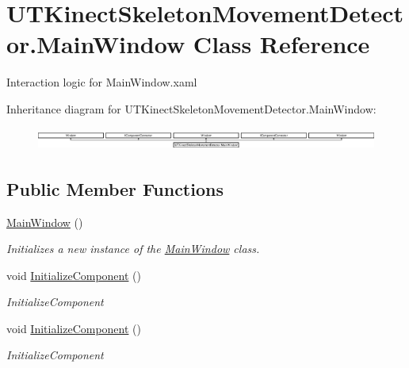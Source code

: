 \hypertarget{classUTKinectSkeletonMovementDetector_1_1MainWindow}{\section{U\-T\-Kinect\-Skeleton\-Movement\-Detector.\-Main\-Window Class Reference}
\label{classUTKinectSkeletonMovementDetector_1_1MainWindow}
}


Interaction logic for Main\-Window.\-xaml  


Inheritance diagram for U\-T\-Kinect\-Skeleton\-Movement\-Detector.\-Main\-Window\-:\begin{figure}[H]
\begin{center}
\leavevmode
\includegraphics[height=0.746667cm]{classUTKinectSkeletonMovementDetector_1_1MainWindow}
\end{center}
\end{figure}
\subsection*{Public Member Functions}
\begin{DoxyCompactItemize}
\item 
\hyperlink{classUTKinectSkeletonMovementDetector_1_1MainWindow_a5ab15131acc3a1f24f1584232412a5f5}{Main\-Window} ()
\begin{DoxyCompactList}\small\item\em Initializes a new instance of the \hyperlink{classUTKinectSkeletonMovementDetector_1_1MainWindow}{Main\-Window} class. \end{DoxyCompactList}\item 
void \hyperlink{classUTKinectSkeletonMovementDetector_1_1MainWindow_a6b89ad1956b2aba773a1b283632bc047}{Initialize\-Component} ()
\begin{DoxyCompactList}\small\item\em Initialize\-Component \end{DoxyCompactList}\item 
void \hyperlink{classUTKinectSkeletonMovementDetector_1_1MainWindow_a6b89ad1956b2aba773a1b283632bc047}{Initialize\-Component} ()
\begin{DoxyCompactList}\small\item\em Initialize\-Component \end{DoxyCompactList}\end{DoxyCompactItemize}
